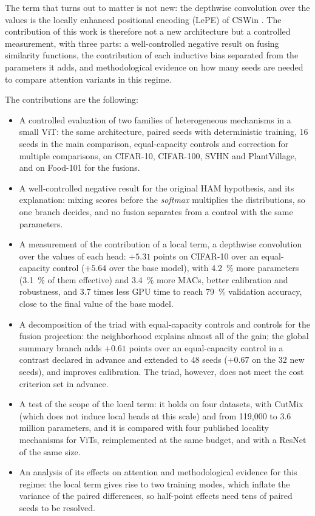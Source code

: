 The term that turns out to matter is not new: the depthwise convolution over the values is the locally enhanced positional encoding (LePE) of CSWin \cite{dong2022cswin}. The contribution of this work is therefore not a new architecture but a controlled measurement, with three parts: a well-controlled negative result on fusing similarity functions, the contribution of each inductive bias separated from the parameters it adds, and methodological evidence on how many seeds are needed to compare attention variants in this regime.

The contributions are the following:
\begin{itemize}
  \item A controlled evaluation of two families of heterogeneous mechanisms in a small ViT: the same architecture, paired seeds with deterministic training, 16 seeds in the main comparison, equal-capacity controls and correction for multiple comparisons, on CIFAR-10, CIFAR-100, SVHN and PlantVillage, and on Food-101 for the fusions.
  \item A well-controlled negative result for the original HAM hypothesis, and its explanation: mixing scores before the \emph{softmax} multiplies the distributions, so one branch decides, and no fusion separates from a control with the same parameters.
  \item A measurement of the contribution of a local term, a depthwise convolution over the values of each head: $+5.31$ points on CIFAR-10 over an equal-capacity control ($+5.64$ over the base model), with 4.2~\% more parameters (3.1~\% of them effective) and 3.4~\% more MACs, better calibration and robustness, and 3.7 times less GPU time to reach 79~\% validation accuracy, close to the final value of the base model.
  \item A decomposition of the triad with equal-capacity controls and controls for the fusion projection: the neighborhood explains almost all of the gain; the global summary branch adds $+0.61$ points over an equal-capacity control in a contrast declared in advance and extended to 48 seeds ($+0.67$ on the 32 new seeds), and improves calibration. The triad, however, does not meet the cost criterion set in advance.
  \item A test of the scope of the local term: it holds on four datasets, with CutMix (which does not induce local heads at this scale) and from 119,000 to 3.6 million parameters, and it is compared with four published locality mechanisms for ViTs, reimplemented at the same budget, and with a ResNet of the same size.
  \item An analysis of its effects on attention and methodological evidence for this regime: the local term gives rise to two training modes, which inflate the variance of the paired differences, so half-point effects need tens of paired seeds to be resolved.
\end{itemize}

